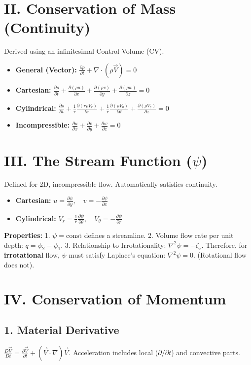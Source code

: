 \documentclass[9pt, a4paper, twocolumn]{article}
\begin{document}
\section{II. Conservation of Mass (Continuity)}
Derived using an infinitesimal Control Volume (CV).
\begin{itemize}
    \item \textbf{General (Vector):} $\frac{\partial \rho}{\partial t} + \nabla \cdot (\rho \vec{V}) = 0$
    \item \textbf{Cartesian:} $\frac{\partial \rho}{\partial t} + \frac{\partial (\rho u)}{\partial x} + \frac{\partial (\rho v)}{\partial y} + \frac{\partial (\rho w)}{\partial z} = 0$
    \item \textbf{Cylindrical:} $\frac{\partial \rho}{\partial t} + \frac{1}{r}\frac{\partial (r \rho V_r)}{\partial r} + \frac{1}{r}\frac{\partial (\rho V_\theta)}{\partial \theta} + \frac{\partial (\rho V_z)}{\partial z} = 0$
    \item \textbf{Incompressible:} $\frac{\partial u}{\partial x} + \frac{\partial v}{\partial y} + \frac{\partial w}{\partial z} = 0$
\end{itemize}

\section{III. The Stream Function ($\psi$)}
Defined for 2D, incompressible flow. Automatically satisfies continuity.
\begin{itemize}
    \item \textbf{Cartesian:} $u = \frac{\partial \psi}{\partial y}, \quad v = -\frac{\partial \psi}{\partial x}$
    \item \textbf{Cylindrical:} $V_r = \frac{1}{r} \frac{\partial \psi}{\partial \theta}, \quad V_\theta = -\frac{\partial \psi}{\partial r}$
\end{itemize}
\textbf{Properties:} 
1. $\psi = \text{const}$ defines a streamline. 
2. Volume flow rate per unit depth: $q = \psi_2 - \psi_1$. 
3. Relationship to Irrotationality: $\nabla^2 \psi = -\zeta_z$. Therefore, for \textbf{irrotational} flow, $\psi$ must satisfy Laplace's equation: $\nabla^2 \psi = 0$. (Rotational flow does not).
\section{IV. Conservation of Momentum}
\subsection{1. Material Derivative}
$\frac{D\vec{V}}{Dt} = \frac{\partial \vec{V}}{\partial t} + (\vec{V} \cdot \nabla)\vec{V}$. 
Acceleration includes local ($\partial/\partial t$) and convective parts.
\end{document}
